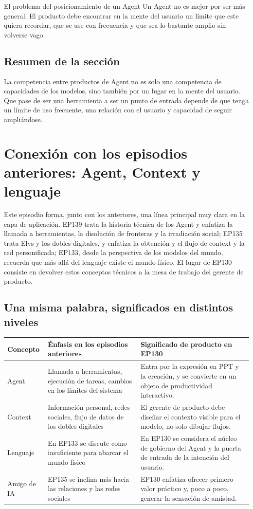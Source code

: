\documentclass[a4paper]{article}
\begin{document}
\begin{importantbox}{El problema del posicionamiento de un Agent}
Un Agent no es mejor por ser más general. El producto debe encontrar en la mente del usuario un límite que este quiera recordar, que se use con frecuencia y que sea lo bastante amplio sin volverse vago.
\end{importantbox}

\subsection{Resumen de la sección}

La competencia entre productos de Agent no es solo una competencia de capacidades de los modelos, sino también por un lugar en la mente del usuario. Que pase de ser una herramienta a ser un punto de entrada depende de que tenga un límite de uso frecuente, una relación con el usuario y capacidad de seguir ampliándose.
\section{Conexión con los episodios anteriores: Agent, Context y lenguaje}

Este episodio forma, junto con los anteriores, una línea principal muy clara en la capa de aplicación. EP139 trata la historia técnica de los Agent y enfatiza la llamada a herramientas, la disolución de fronteras y la irradiación social; EP135 trata Elys y los dobles digitales, y enfatiza la obtención y el flujo de context y la red personificada; EP133, desde la perspectiva de los modelos del mundo, recuerda que más allá del lenguaje existe el mundo físico. El lugar de EP130 consiste en devolver estos conceptos técnicos a la mesa de trabajo del gerente de producto.

\subsection{Una misma palabra, significados en distintos niveles}

\begin{longtable}{p{}p{}p{}}
\toprule
Concepto & Énfasis en los episodios anteriores & Significado de producto en EP130 \\
\midrule
Agent & Llamada a herramientas, ejecución de tareas, cambios en los límites del sistema & Entra por la expresión en PPT y la creación, y se convierte en un objeto de productividad interactivo. \\
Context & Información personal, redes sociales, flujo de datos de los dobles digitales & El gerente de producto debe diseñar el contexto visible para el modelo, no solo dibujar flujos. \\
Lenguaje & En EP133 se discute como insuficiente para abarcar el mundo físico & En EP130 se considera el núcleo de gobierno del Agent y la puerta de entrada de la intención del usuario. \\
Amigo de IA & EP135 se inclina más hacia las relaciones y las redes sociales & EP130 enfatiza ofrecer primero valor práctico y, poco a poco, generar la sensación de amistad. \\
\bottomrule
\end{longtable}
\end{document}

